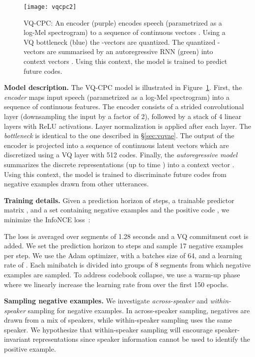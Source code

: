 \documentclass[a4paper]{article}
\newcommand{\imagesep}{\vspace*{-4pt}}
\begin{document}
\begin{figure}[!t]
    \centering
\texttt{[image: vqcpc2]}
    \imagesep
    \caption{
    VQ-CPC: An encoder (purple) encodes speech (parametrized as a log-Mel spectrogram) to a sequence of continuous vectors . 
    Using a VQ bottleneck (blue) the -vectors are quantized.
    The quantized -vectors are summarised by an autoregressive RNN (green) into context vectors .
    Using this context, the model is trained to predict future codes.}
    \label{fig:vqcpc}
\end{figure}

\textbf{Model description.}
The VQ-CPC model is illustrated in Figure~\ref{fig:vqcpc}.
First, the \textit{encoder} maps input speech (parametrized as a log-Mel spectrogram) into a sequence of continuous features. 
The encoder consists of a strided convolutional layer (downsampling the input by a factor of 2), followed by a stack of 4 linear layers with ReLU activations.
Layer normalization is applied after each layer.
The \textit{bottleneck} is identical to the one described in \S\ref{sec:vqvae}. 
The output of the encoder is projected into a sequence of continuous latent vectors which are discretized using a VQ layer with 512 codes.
Finally, the \textit{autoregressive model} summarizes the discrete representations (up to time ) into a context vector . 
Using this context, the model is trained to discriminate future codes from negative examples drawn from other utterances.


\textbf{Training details.}
Given a prediction horizon of  steps, a trainable predictor matrix , and a set   containing negative examples and the positive code , we minimize the InfoNCE loss~\cite{vandenoord+etal_arxiv18}:

The loss is averaged over segments of 1.28 seconds and a VQ commitment cost is added.
We set the prediction horizon to  steps and sample 17 negative examples per step.
We use the Adam optimizer, with a batches size of 64, and a learning rate of . 
Each minibatch is divided into groups of 8 segments from which negative examples are sampled.
To address codebook collapse, we use a warm-up phase where we linearly increase the learning rate from  over the first 150 epochs.


\textbf{Sampling negative examples.}
We investigate \textit{across-speaker} and \textit{within-speaker} sampling for negative examples.
In across-speaker sampling, negatives are drawn from a mix of speakers, while within-speaker sampling uses the same speaker.
We hypothesize that {within-speaker} sampling will encourage speaker-invariant representations since speaker information cannot be used to identify  the positive example.
\end{document}
